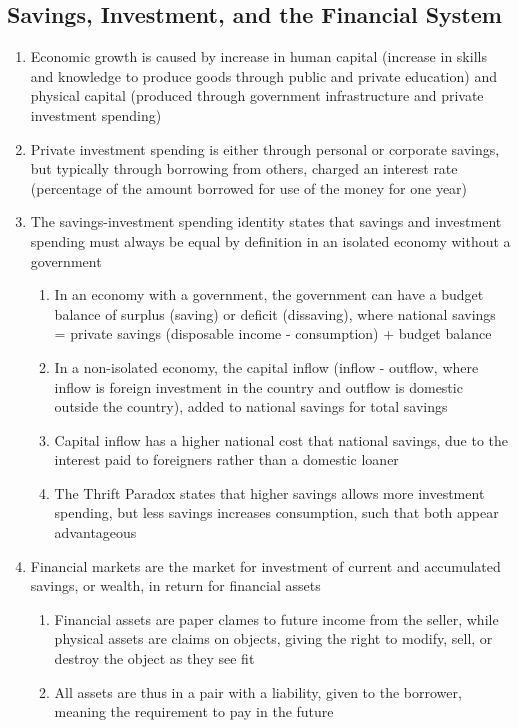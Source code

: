 \documentclass[11 pt, twoside]{article}
\begin{document}
\subsection{Savings, Investment, and the Financial System}
\begin{enumerate}
\item Economic growth is caused by increase in human capital (increase in skills and knowledge to produce goods through public and private education) and physical capital (produced through government infrastructure and private investment spending)
\item Private investment spending is either through personal or corporate savings, but typically through borrowing from others, charged an interest rate (percentage of the amount borrowed for use of the money for one year)
\item The savings-investment spending identity states that savings and investment spending must always be equal by definition in an isolated economy without a government
\begin{enumerate}
\item In an economy with a government, the government can have a budget balance of surplus (saving) or deficit (dissaving), where national savings = private savings (disposable income - consumption) + budget balance
\item In a non-isolated economy, the capital inflow (inflow - outflow, where inflow is foreign investment in the country and outflow is domestic outside the country), added to national savings for total savings
\item Capital inflow has a higher national cost that national savings, due to the interest paid to foreigners rather than a domestic loaner
\item The Thrift Paradox states that higher savings allows more investment spending, but less savings increases consumption, such that both appear advantageous
\end{enumerate}
\item Financial markets are the market for investment of current and accumulated savings, or wealth, in return for financial assets
\begin{enumerate}
\item Financial assets are paper clames to future income from the seller, while physical assets are claims on objects, giving the right to modify, sell, or destroy the object as they see fit
\item All assets are thus in a pair with a liability, given to the borrower, meaning the requirement to pay in the future

\end{enumerate}
\end{enumerate}
\end{document}
